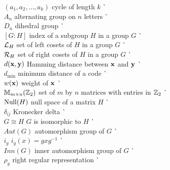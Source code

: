 \begin{tabbing}
$(a_1, a_2, \ldots, a_k )$ \> cycle of length $k$ \> 
     \` \pageref{notecycle} \\
$A_n$ \> alternating group on $n$ letters \> 
     \` \pageref{alternatinggroup} \\
$D_n$ \> dihedral group \> \` \pageref{dihedralgroup} \\
$[G:H]$ \> index of a subgroup $H$ in a group $G$ \> 
     \` \pageref{indexofasubgroup}  \\
${\cal L}_H$ \> set of left cosets of $H$ in a group $G$ \> 
     \` \pageref{notesetleft} \\
${\cal R}_H$ \> set of right cosets of $H$ in a group $G$ \>
     \` \pageref{notesetright}  \\
$d({\bold x}, {\bold y})$ \> Hamming distance between ${\bold x}$ and
     ${\bold y}$ \> \` \pageref{noteHammingdist} \\
$d_{\min}$ \> minimum distance of a code \> \` \pageref{notemindist}\\ 
$w({\bold x})$ \> weight of ${\bold x}$ \> \` \pageref{noteweight} \\
${\Bbb M}_{m \times n}({\Bbb Z}_2)$ \> set of $m$ by $n$ matrices with 
     entries in ${\Bbb Z}_2$ \> \` \pageref{notembyn} \\
${\rm Null}(H)$ \> null space of a matrix $H$ \> 
     \` \pageref{notenull} \\
$\delta_{ij}$ \> Kronecker delta \> \` \pageref{notekron} \\
$G \cong H$ \> $G$ is isomorphic to $H$ \> \` \pageref{noteisomorph} \\
$Aut(G)$ \> automorphism group of $G$ \> \` \pageref{noteauto} \\
$i_g$ \> $i_g(x) = gxg^{-1}$ \> \` \pageref{noteinner} \\
$Inn(G)$ \> inner automorphism group of $G$ \> \` \pageref{noteinneraut} \\
$\rho_g$ \> right regular representation \> \` \pageref{noterightreg}
\end{tabbing} \clearpage
